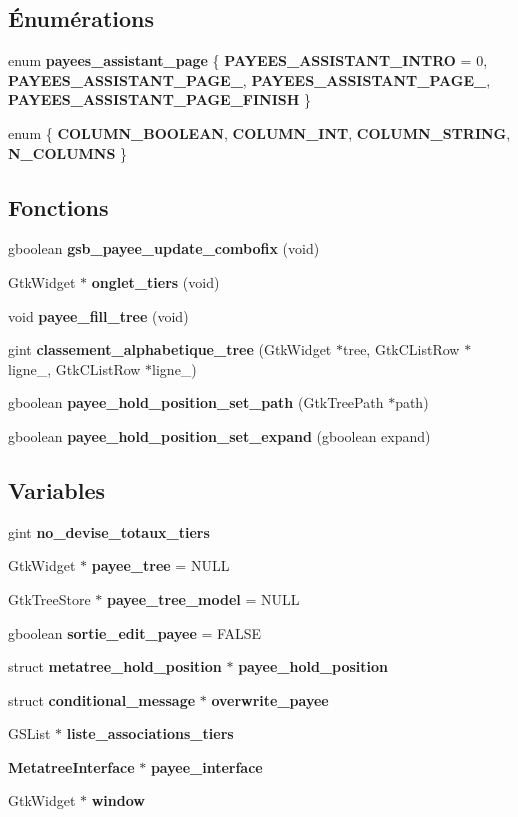 \subsection*{Énumérations}
\begin{DoxyCompactItemize}
\item 
enum {\bf payees\_\-assistant\_\-page} \{ {\bf PAYEES\_\-ASSISTANT\_\-INTRO} =  0, 
{\bf PAYEES\_\-ASSISTANT\_\-PAGE\_}, 
{\bf PAYEES\_\-ASSISTANT\_\-PAGE\_}, 
{\bf PAYEES\_\-ASSISTANT\_\-PAGE\_\-FINISH}
 \}
\item 
enum \{ {\bf COLUMN\_\-BOOLEAN}, 
{\bf COLUMN\_\-INT}, 
{\bf COLUMN\_\-STRING}, 
{\bf N\_\-COLUMNS}
 \}
\end{DoxyCompactItemize}
\subsection*{Fonctions}
\begin{DoxyCompactItemize}
\item 
gboolean {\bf gsb\_\-payee\_\-update\_\-combofix} (void)
\item 
GtkWidget $\ast$ {\bf onglet\_\-tiers} (void)
\item 
void {\bf payee\_\-fill\_\-tree} (void)
\item 
gint {\bf classement\_\-alphabetique\_\-tree} (GtkWidget $\ast$tree, GtkCListRow $\ast$ligne\_, GtkCListRow $\ast$ligne\_)
\item 
gboolean {\bf payee\_\-hold\_\-position\_\-set\_\-path} (GtkTreePath $\ast$path)
\item 
gboolean {\bf payee\_\-hold\_\-position\_\-set\_\-expand} (gboolean expand)
\end{DoxyCompactItemize}
\subsection*{Variables}
\begin{DoxyCompactItemize}
\item 
gint {\bf no\_\-devise\_\-totaux\_\-tiers}
\item 
GtkWidget $\ast$ {\bf payee\_\-tree} = NULL
\item 
GtkTreeStore $\ast$ {\bf payee\_\-tree\_\-model} = NULL
\item 
gboolean {\bf sortie\_\-edit\_\-payee} = FALSE
\item 
struct {\bf metatree\_\-hold\_\-position} $\ast$ {\bf payee\_\-hold\_\-position}
\item 
struct {\bf conditional\_\-message} $\ast$ {\bf overwrite\_\-payee}
\item 
GSList $\ast$ {\bf liste\_\-associations\_\-tiers}
\item 
{\bf MetatreeInterface} $\ast$ {\bf payee\_\-interface}
\item 
GtkWidget $\ast$ {\bf window}
\end{DoxyCompactItemize}


